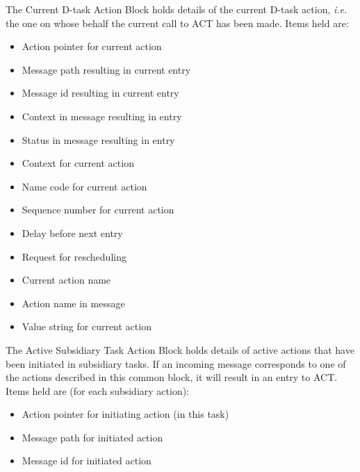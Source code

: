 \documentclass[twoside,11pt,nolof]{starlink}
\begin{document}
The Current D-task Action Block holds details of the current D-task action,
\textit{i.e.} the one on whose behalf the current call to ACT has been made.
Items held are:
\begin{itemize}
\item Action pointer for current action
\item Message path resulting in current entry
\item Message id resulting in current entry
\item Context in message resulting in entry
\item Status in message resulting in entry
\item Context for current action
\item Name code for current action
\item Sequence number for current action
\item Delay before next entry
\item Request for rescheduling
\item Current action name
\item Action name in message
\item Value string for current action
\end{itemize}

The Active Subsidiary Task Action Block holds details of active actions that
have been initiated in subsidiary tasks. If an incoming message corresponds to
one of the actions described in this common block, it will result in an entry
to ACT. Items held are (for each subsidiary action):
\begin{itemize}
\item Action pointer for initiating action (in this task)
\item Message path for initiated action
\item Message id for initiated action
\end{itemize}
\vfill
\appendix
\end{document}
